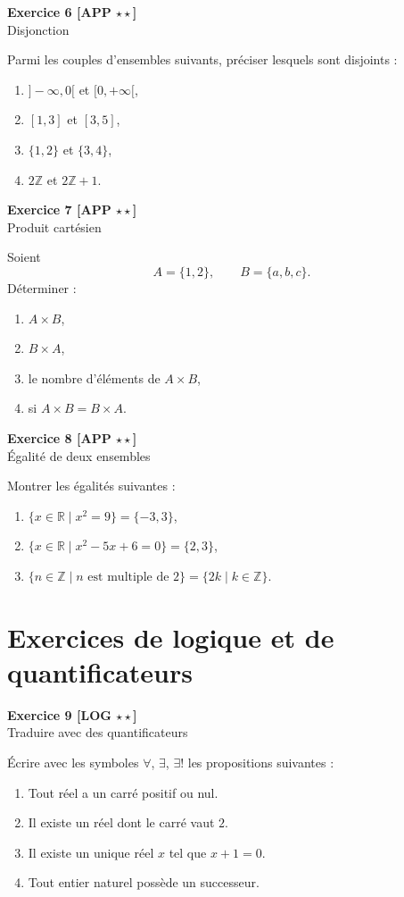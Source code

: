 \documentclass[11pt,a4paper]{article}
\newcommand{\R}{\mathbb{R}}
\newcommand{\Z}{\mathbb{Z}}
\begin{document}
\textbf{Exercice 6 [APP \(\star\star\)]}\\
Disjonction

Parmi les couples d’ensembles suivants, préciser lesquels sont disjoints :
\begin{enumerate}[label=\alph*)]
    \item \(]-\infty,0[\) et \([0,+\infty[\),
    \item \([1,3]\) et \([3,5]\),
    \item \(\{1,2\}\) et \(\{3,4\}\),
    \item \(2\Z\) et \(2\Z+1\).
\end{enumerate}

\textbf{Exercice 7 [APP \(\star\star\)]}\\
Produit cartésien

Soient
\[
A=\{1,2\},\qquad B=\{a,b,c\}.
\]
Déterminer :
\begin{enumerate}[label=\alph*)]
    \item \(A\times B\),
    \item \(B\times A\),
    \item le nombre d’éléments de \(A\times B\),
    \item si \(A\times B=B\times A\).
\end{enumerate}

\textbf{Exercice 8 [APP \(\star\star\)]}\\
Égalité de deux ensembles

Montrer les égalités suivantes :
\begin{enumerate}[label=\alph*)]
    \item \(\{x\in \R\mid x^2=9\}=\{-3,3\}\),
    \item \(\{x\in \R\mid x^2-5x+6=0\}=\{2,3\}\),
    \item \(\{n\in \Z\mid n \text{ est multiple de } 2\}=\{2k\mid k\in \Z\}\).
\end{enumerate}

\section*{Exercices de logique et de quantificateurs}

\textbf{Exercice 9 [LOG \(\star\star\)]}\\
Traduire avec des quantificateurs

Écrire avec les symboles \(\forall\), \(\exists\), \(\exists!\) les propositions suivantes :
\begin{enumerate}[label=\alph*)]
    \item Tout réel a un carré positif ou nul.
    \item Il existe un réel dont le carré vaut \(2\).
    \item Il existe un unique réel \(x\) tel que \(x+1=0\).
    \item Tout entier naturel possède un successeur.
\end{enumerate}
\end{document}
